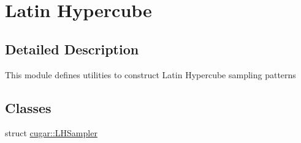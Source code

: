 \hypertarget{group___latiny_hypercube_module}{}\section{Latin Hypercube}
\label{group___latiny_hypercube_module}


\subsection{Detailed Description}
This module defines utilities to construct Latin Hypercube sampling patterns \subsection*{Classes}
\begin{DoxyCompactItemize}
\item 
struct \hyperlink{structcugar_1_1_l_h_sampler}{cugar\+::\+L\+H\+Sampler}
\end{DoxyCompactItemize}
